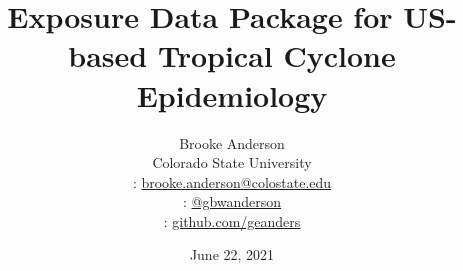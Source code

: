 \usepackage{booktabs}
\usepackage{array}
\usepackage{colortbl}
\usepackage[british]{babel}
\usepackage{graphicx,hyperref,url}
\usepackage{fontawesome}
\usepackage{hyperref}
\usepackage{adjustbox}
\usepackage{appendixnumberbeamer}
\hypersetup{colorlinks=true,allcolors=blue}
\usepackage{xcolor}

\title{Exposure Data Package for US-based Tropical Cyclone Epidemiology}
\date{June 22, 2021}

\author[Anderson]{
  Brooke Anderson\\ 
  Colorado State University \medskip \\ 
  {\small \faEnvelope: \url{brooke.anderson@colostate.edu}} \\
  {\small \faTwitter: \href{www.twitter.com/gbwanderson}{@gbwanderson}} \\
  {\small \faGithub:  \url{github.com/geanders}}
  }



